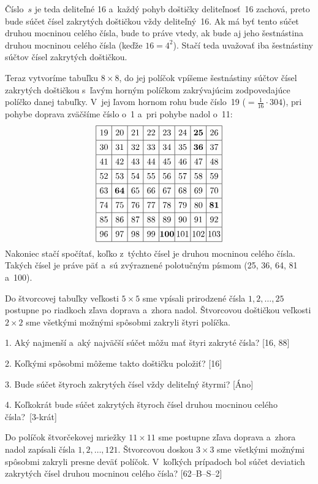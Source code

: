 {Číslo~$s$ je teda deliteľné 16 a~každý pohyb doštičky
deliteľnosť~16 zachová, preto bude súčet čísel zakrytých doštičkou vždy
deliteľný~16. Ak má byť tento súčet druhou mocninou celého čísla,
bude to práve vtedy, ak bude aj jeho šestnástina druhou mocninou celého
čísla (keďže $16 = 4^2$). Stačí teda uvažovať iba šestnástiny
súčtov čísel zakrytých doštičkou.

Teraz vytvoríme tabuľku $8 \times 8$, do jej políčok vpíšeme
šestnástiny súčtov čísel zakrytých doštičkou s~ľavým horným políčkom
zakrývajúcim zodpovedajúce políčko danej tabuľky.
V~jej ľavom hornom rohu bude
číslo~19 ($=\frac 1 {16} \cdot 304$), pri pohybe doprava zväčšíme číslo
o~1 a~pri pohybe nadol o~11:
$$
\vbox{\let\\=\cr\everycr{\noalign{\hrule}}\offinterlineskip
\def\strut{\vrule width 0pt height1.1em depth.55em\relax}
\halign{\strut\vrule#&&\hbox to1.8em{\hss#\unskip\hss}\vrule\cr
&19&20&21&22&23&24&{\bf 25}&26 \\
&30&31&32&33&34&35&{\bf 36}&37 \\
&41&42&43&44&45&46&47&48 \\
&52&53&54&55&56&57&58&59 \\
&63&{\bf 64}&65&66&67&68&69&70 \\
&74&75&76&77&78&79&80&{\bf 81} \\
&85&86&87&88&89&90&91&92 \\
&96&97&98&99&{\bf 100}&101&102&103 \\
}}
$$
Nakoniec stačí spočítať, koľko z~týchto čísel je druhou mocninou
celého čísla. Takých čísel je práve päť a~sú zvýraznené polotučným písmom
(25, 36, 64, 81 a~100).

Do štvorcovej tabuľky veľkosti $5 \times 5$ sme vpísali prirodzené čísla
$1, 2, \dots, 25$ postupne po riadkoch zľava doprava a~zhora nadol.
Štvorcovou doštičkou veľkosti $2 \times 2$ sme všetkými možnými spôsobmi
zakryli štyri políčka. \\
\item{1.} Aký najmenší a~aký najväčší súčet môžu mať štyri zakryté čísla? [16, 88]
\item{2.} Koľkými spôsobmi môžeme takto doštičku položiť? [16]
\item{3.} Bude súčet štyroch zakrytých čísel vždy deliteľný štyrmi? [Áno]
\item{4.} Koľkokrát bude súčet zakrytých štyroch čísel druhou mocninou celého čísla?~[3-krát]

Do políčok štvorčekovej mriežky $11{\times}11$ sme postupne zľava doprava a~zhora nadol
zapísali čísla $1,2,\dots,121$. Štvorcovou doskou $3{\times}3$ sme všetkými
možnými spôsobmi zakryli presne deväť políčok. V~koľkých prípadoch bol súčet deviatich zakrytých
čísel druhou mocninou celého čísla? [62--B--S--2]

}
